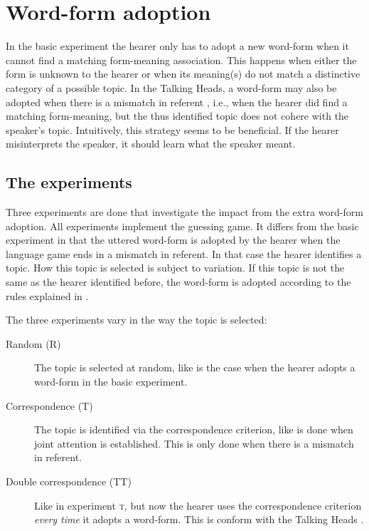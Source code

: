 \section{Word-form adoption}\label{s:par:adopt}

In the basic experiment the hearer only has to adopt a new word-form when it cannot find a matching form-meaning association. This happens when either the form is unknown to the hearer or when its meaning(s) do not match a distinctive category of a possible topic. In the Talking Heads, a word-form may also be adopted when there is a mismatch in referent \citep{steels:2000}, i.e., when the hearer did find a matching form-meaning, but the thus identified topic does not cohere with the speaker's topic. Intuitively, this strategy seems to be beneficial. If the hearer misinterprets the speaker, it should learn what the speaker meant.

\subsection{The experiments}

Three experiments are done that investigate the impact from the extra word-form adoption. All experiments implement the guessing game. It differs from the basic experiment in that the uttered word-form is adopted by the hearer when the language game ends in a mismatch in referent. In that case the hearer identifies a topic. How this topic is selected is subject to variation. If this topic is not the same as the hearer identified before, the word-form is adopted according to the rules explained in .

The three experiments vary in the way the topic is selected:

\begin{description}
\item[Random (R)] The topic is selected at random, like is the case when the hearer adopts a word-form in the basic experiment.

\item[Correspondence (T)] The topic is identified via the correspondence criterion, like is done when joint attention is established. This is only done when there is a mismatch in referent.

\item[Double correspondence (TT)] Like in experiment {\scshape t}, but now the hearer uses the correspondence criterion {\em every time} it adopts a word-form. This is conform with the Talking Heads \citep{steels:2000}.
\end{description}

